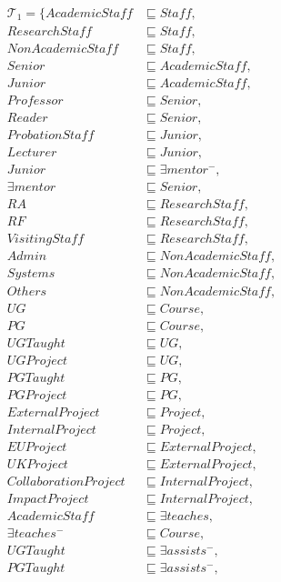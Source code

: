\documentclass{article}
\begin{document}
\begin{align*}
\mathcal{T}_1 =\{ %
%
AcademicStaff &\sqsubseteq Staff,\\
ResearchStaff &\sqsubseteq Staff,\\
NonAcademicStaff &\sqsubseteq Staff,\\
%
Senior &\sqsubseteq AcademicStaff,\\
Junior &\sqsubseteq AcademicStaff,\\
%
Professor &\sqsubseteq Senior,\\
Reader &\sqsubseteq Senior,\\
%
ProbationStaff &\sqsubseteq Junior,\\
Lecturer &\sqsubseteq Junior,\\
%
Junior &\sqsubseteq \exists mentor^-,\\
\exists mentor &\sqsubseteq Senior,\\
RA &\sqsubseteq ResearchStaff,\\
RF &\sqsubseteq ResearchStaff,\\
VisitingStaff &\sqsubseteq ResearchStaff,\\
%
Admin &\sqsubseteq NonAcademicStaff,\\
Systems &\sqsubseteq NonAcademicStaff,\\
Others &\sqsubseteq NonAcademicStaff,\\
%
UG &\sqsubseteq Course,\\
PG &\sqsubseteq Course,\\
%
UGTaught &\sqsubseteq UG,\\
UGProject &\sqsubseteq UG,\\
%
PGTaught &\sqsubseteq PG,\\
PGProject &\sqsubseteq PG,\\
%
ExternalProject &\sqsubseteq Project,\\
InternalProject &\sqsubseteq Project,\\
%
EUProject &\sqsubseteq ExternalProject,\\
UKProject &\sqsubseteq ExternalProject,\\
%
CollaborationProject &\sqsubseteq InternalProject,\\
ImpactProject &\sqsubseteq InternalProject,\\
%
AcademicStaff &\sqsubseteq \exists teaches,\\
\exists teaches^- &\sqsubseteq Course,\\
%
UGTaught &\sqsubseteq \exists assists^-,\\
PGTaught &\sqsubseteq \exists assists^-,\\

\end{align*}
\end{document}

